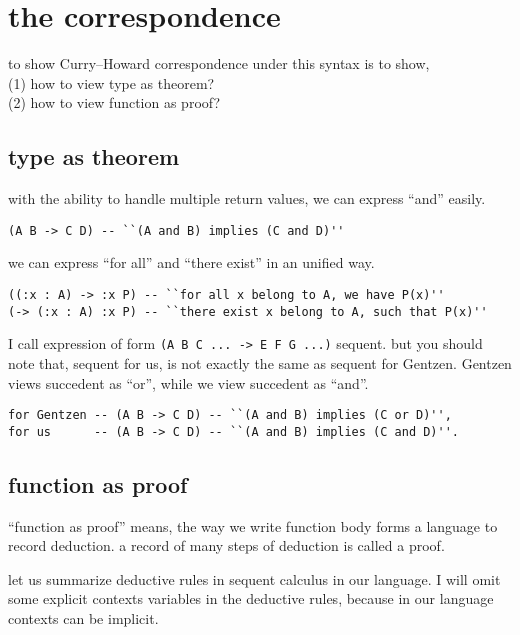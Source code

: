 \documentclass{sigplanconf}
\begin{document}
\section{the correspondence}

to show Curry–Howard correspondence under this syntax
is to show, \\
(1) how to view type as theorem? \\
(2) how to view function as proof?

\subsection{type as theorem}

with the ability to handle multiple return values,
we can express ``and'' easily.

{\scriptsize\begin{verbatim}
(A B -> C D) -- ``(A and B) implies (C and D)''
\end{verbatim}}

we can express ``for all'' and ``there exist'' in an unified way.

{\scriptsize\begin{verbatim}
((:x : A) -> :x P) -- ``for all x belong to A, we have P(x)''
(-> (:x : A) :x P) -- ``there exist x belong to A, such that P(x)''
\end{verbatim}}

I call expression of form {\scriptsize\verb|(A B C ... -> E F G ...)|} sequent.
but you should note that,
sequent for us, is not exactly the same as sequent for Gentzen.
Gentzen views succedent as ``or'', while we view succedent as ``and''.

{\scriptsize\begin{verbatim}
for Gentzen -- (A B -> C D) -- ``(A and B) implies (C or D)'',
for us      -- (A B -> C D) -- ``(A and B) implies (C and D)''.
\end{verbatim}}

\subsection{function as proof}

``function as proof'' means,
the way we write function body forms a language to record deduction.
a record of many steps of deduction is called a proof.

let us summarize deductive rules in sequent calculus in our language.
I will omit some explicit contexts variables in the deductive rules,
because in our language contexts can be implicit.
\end{document}
